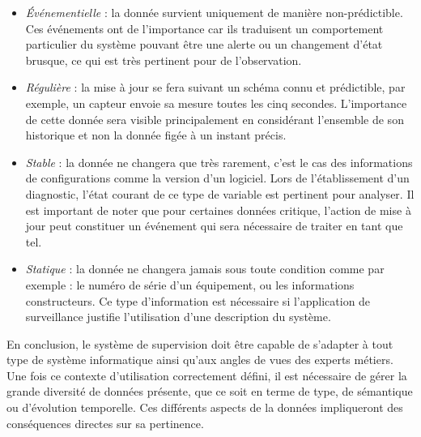 \begin{itemize}
    \begin{itemize} 
        \item \textit{Événementielle} : la donnée survient uniquement de manière non-prédictible. Ces événements ont de l'importance car ils traduisent un comportement particulier du système pouvant être une alerte ou un changement d'état brusque, ce qui est très pertinent pour de l'observation.
        \item \textit{Régulière} : la mise à jour se fera suivant un schéma connu et prédictible, par exemple, un capteur envoie sa mesure toutes les cinq secondes. L'importance de cette donnée sera visible principalement en considérant l'ensemble de son historique et non la donnée figée à un instant précis.
        \item \textit{Stable} : la donnée ne changera que très rarement, c'est le cas des informations de configurations comme la version d'un logiciel. Lors de l'établissement d'un diagnostic, l'état courant de ce type de variable est pertinent pour analyser. Il est important de noter que pour certaines données critique, l'action de mise à jour peut constituer un événement qui sera nécessaire de traiter en tant que tel.
        \item \textit{Statique} : la donnée ne changera jamais sous toute condition comme par exemple : le numéro de série d'un équipement, ou les informations constructeurs. Ce type d'information est nécessaire si l'application de surveillance justifie l'utilisation d'une description du système.
    \end{itemize}
\end{itemize}

En conclusion, le système de supervision doit être capable de s'adapter à tout type de système informatique ainsi qu'aux angles de vues des experts métiers. Une fois ce contexte d'utilisation correctement défini, il est nécessaire de gérer la grande diversité de données présente, que ce soit en terme de type, de sémantique ou d'évolution temporelle. Ces différents aspects de la données impliqueront des conséquences directes sur sa pertinence.
